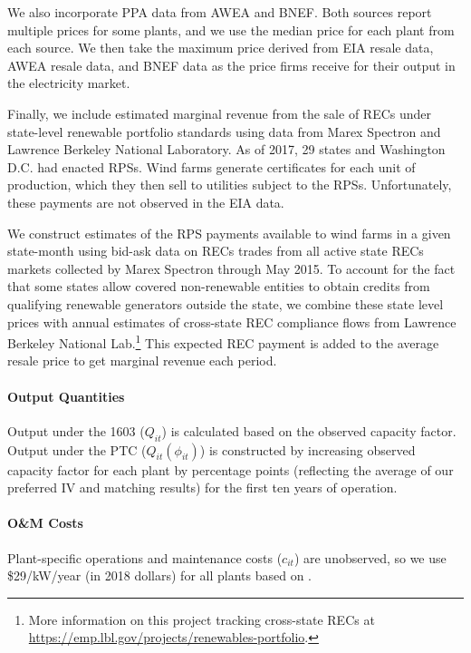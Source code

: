 \documentclass[12pt]{article}
\begin{document}
We also incorporate PPA data from AWEA and BNEF.  Both sources report multiple prices for some plants, and we use the median price for each plant from each source. We then take the maximum price derived from EIA resale data, AWEA resale data, and BNEF data as the price firms receive for their output in the electricity market.

Finally, we include estimated marginal revenue from the sale of RECs under state-level renewable portfolio standards using data from Marex Spectron and Lawrence Berkeley National Laboratory. As of 2017, 29 states and Washington D.C. had enacted RPSs. Wind farms generate certificates for each unit of production, which they then sell to utilities subject to the RPSs. Unfortunately, these payments are not observed in the EIA data.

We construct estimates of the RPS payments available to wind farms in a given state-month using bid-ask data on RECs trades from all active state RECs markets collected by Marex Spectron through May 2015. To account for the fact that some states allow covered non-renewable entities to obtain credits from qualifying renewable generators outside the state, we combine these state level prices with annual estimates of cross-state REC compliance flows from Lawrence Berkeley National Lab.\footnote{More information on this project tracking cross-state RECs at \href{https://emp.lbl.gov/projects/renewables-portfolio}{https://emp.lbl.gov/projects/renewables-portfolio}.} This expected REC payment is added to the average resale price to get marginal revenue each period. 

\paragraph*{Output Quantities}
Output under the 1603 ($Q_{it}$) is calculated based on the observed capacity factor. Output under the PTC ($Q_{it}(\phi_{it})$) is constructed by increasing observed capacity factor for each plant by  \unskip percentage points (reflecting the average of our preferred IV and matching results) for the first ten years of operation.

\paragraph*{O\&M Costs}
Plant-specific operations and maintenance costs ($c_{it}$) are unobserved, so we use \$29/kW/year (in 2018 dollars) for all plants based on \cite{wiser_2018_2019}.
\end{document}
